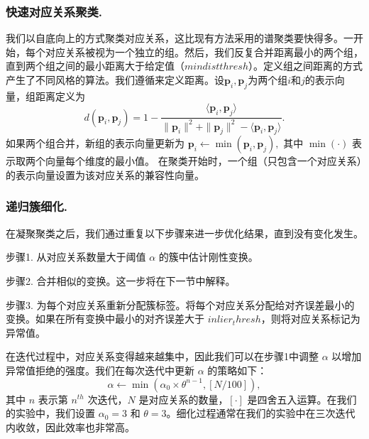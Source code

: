 \subsubsection{快速对应关系聚类.}
我们以自底向上的方式聚类对应关系，这比现有方法采用的谱聚类\cite{parra2019practical}\cite{shi2021robin}要快得多。一开始，每个对应关系被视为一个独立的组。然后，我们反复合并距离最小的两个组，直到两个组之间的最小距离大于给定值（$min dist thresh$）。定义组之间距离的方式产生了不同风格的算法。我们遵循\cite{Tlinkage}来定义距离。设$\mathbf{p}_i, \mathbf{p}_j$为两个组$i$和$j$的表示向量，组距离定义为
\begin{equation}
d(\mathbf{p}_i, \mathbf{p}_j)= 1-\frac{\langle \mathbf{p}_i,\mathbf{p}_j\rangle}{\parallel \mathbf{p}_i\parallel ^2+\parallel \mathbf{p}_j\parallel ^2-\langle \mathbf{p}_i,\mathbf{p}_j\rangle}.
\end{equation}
如果两个组合并，新组的表示向量更新为
$\mathbf{p}_i \leftarrow \min (\mathbf{p}_i, \mathbf{p}_j),$ 其中 $\min(\cdot)$ 表示取两个向量每个维度的最小值。
在聚类开始时，一个组（只包含一个对应关系）的表示向量设置为该对应关系的兼容性向量。

\subsubsection{递归簇细化.}
\label{sec:cluster_refinement}
在凝聚聚类之后，我们通过重复以下步骤来进一步优化结果，直到没有变化发生。

步骤1. 从对应关系数量大于阈值 $\alpha$ 的簇中估计刚性变换。

步骤2. 合并相似的变换。这一步将在下一节中解释。

步骤3. 为每个对应关系重新分配簇标签。将每个对应关系分配给对齐误差最小的变换。如果在所有变换中最小的对齐误差大于 $inlier_thresh$，则将对应关系标记为异常值。

在迭代过程中，对应关系变得越来越集中，因此我们可以在步骤1中调整 $\alpha$ 以增加异常值拒绝的强度。我们在每次迭代中更新 $\alpha$ 的策略如下：
\begin{equation}
\alpha \leftarrow \min(\alpha _0\times \theta ^{n-1},\left[N/100 \right] ),
\label{eq:alpha}
\end{equation}
其中 $n$ 表示第 $n^{th}$ 次迭代，$N$ 是对应关系的数量，$\left[ \cdot \right]$ 是四舍五入运算。在我们的实验中，我们设置 $\alpha_0 = 3$ 和 $\theta = 3$。细化过程通常在我们的实验中在三次迭代内收敛，因此效率也非常高。

